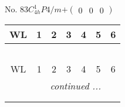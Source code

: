 \documentclass[fleqn,9pt,landscape]{jsarticle}
\begin{document}
\newpage
No. 83\quad$C_{4h}^{1}$\quad$P4/m$\quad[ tetragonal ]\quad$+\begin{pmatrix} 0 & 0 & 0 \end{pmatrix}$
\begin{center}
\renewcommand{\arraystretch}{1.2}
\begin{longtable}{ccccccc}
 \hline \hline
WL & 1 & 2 & 3 & 4 & 5 & 6 \\ \hline \endfirsthead

\multicolumn{6}{l}{\tablename\ \thetable{}} \\
 \hline \hline
WL & 1 & 2 & 3 & 4 & 5 & 6 \\ \hline \endhead

 \hline \hline
\multicolumn{6}{r}{\footnotesize\it continued ...} \\ \endfoot

 \hline \hline
\multicolumn{6}{r}{} \\ \endlastfoot


\end{longtable}
\end{center}
\end{document}
